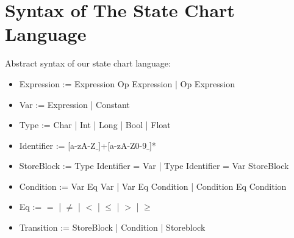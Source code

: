 \section{Syntax of The State Chart Language}

Abstract syntax of our state chart language:

\begin{itemize}
	\item Expression := Expression Op Expression $|$ Op Expression
	\item Var := Expression | Constant
	\item Type := Char | Int | Long | Bool | Float
	\item Identifier := [a-zA-Z$\_$]+[a-zA-Z0-9$\_$]*  
	
	\item StoreBlock := Type Identifier = Var | Type Identifier = Var StoreBlock

	\item Condition := Var Eq Var | Var Eq Condition | Condition Eq Condition
	
	\item Eq := $=$ | $\neq$ | $<$ | $\leq$ | $>$ | $\geq$	
	
	\item Transition := StoreBlock | Condition | Storeblock
	
\end{itemize}

